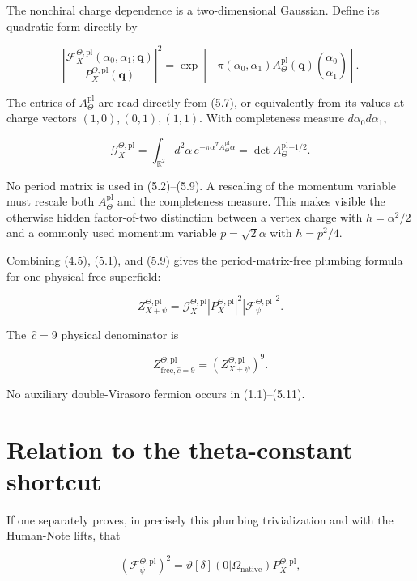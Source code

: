 \documentclass[11pt]{article}
\begin{document}
The nonchiral charge dependence is a two-dimensional Gaussian.  Define its
quadratic form directly by

\[
 \left|
 \frac{\mathcal F_X^{\Theta,\mathrm{pl}}
       (\alpha_0,\alpha_1;\mathbf q)}
      {P_X^{\Theta,\mathrm{pl}}(\mathbf q)}
 \right|^2
 =\exp\!\left[-\pi
 (\alpha_0,\alpha_1)A_\Theta^{\mathrm{pl}}(\mathbf q)
 \binom{\alpha_0}{\alpha_1}\right].
\tag{5.8}
\]

The entries of \(A_\Theta^{\mathrm{pl}}\) are read directly from (5.7), or
equivalently from its values at charge vectors \((1,0),(0,1),(1,1)\).  With
completeness measure \(d\alpha_0d\alpha_1\),

\[
 \mathcal G_X^{\Theta,\mathrm{pl}}
 =\int_{\mathbb R^2}d^2\alpha\,
   e^{-\pi\alpha^TA_\Theta^{\mathrm{pl}}\alpha}
 =\det A_\Theta^{\mathrm{pl}}{}^{-1/2}.
\tag{5.9}
\]

No period matrix is used in (5.2)--(5.9).  A rescaling of the momentum
variable must rescale both \(A_\Theta^{\mathrm{pl}}\) and the completeness
measure.  This makes visible the otherwise hidden factor-of-two distinction
between a vertex charge with \(h=\alpha^2/2\) and a commonly used momentum
variable \(p=\sqrt2\alpha\) with \(h=p^2/4\).

Combining (4.5), (5.1), and (5.9) gives the period-matrix-free plumbing
formula for one physical free superfield:

\[
\boxed{
 Z_{X+\psi}^{\Theta,\mathrm{pl}}
 =\mathcal G_X^{\Theta,\mathrm{pl}}
  \left|P_X^{\Theta,\mathrm{pl}}\right|^2
  \left|\mathcal F_{\psi}^{\Theta,\mathrm{pl}}\right|^2.}
\tag{5.10}
\]

The \,\(\widehat c=9\) physical denominator is

\[
 Z_{\mathrm{free},\widehat c=9}^{\Theta,\mathrm{pl}}
 =\left(Z_{X+\psi}^{\Theta,\mathrm{pl}}\right)^9.
\tag{5.11}
\]

No auxiliary double-Virasoro fermion occurs in (1.1)--(5.11).

\section{Relation to the theta-constant shortcut}

If one separately proves, in precisely this plumbing trivialization and with
the Human-Note lifts, that

\[
 \left(\mathcal F_\psi^{\Theta,\mathrm{pl}}\right)^2
 =\vartheta[\delta](0|\Omega_{\mathrm{native}})
  P_X^{\Theta,\mathrm{pl}},
\tag{6.1}
\]
\end{document}
